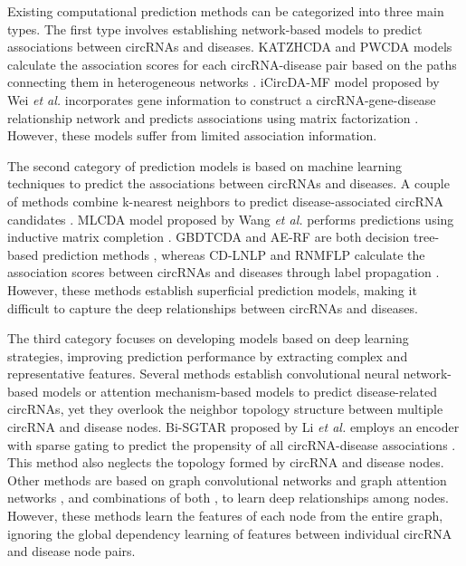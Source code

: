\documentclass[journal,twoside,web]{ieeecolor}
\begin{document}
Existing computational prediction methods can be categorized into three main types. The first type involves establishing network-based models to predict associations between circRNAs and diseases. KATZHCDA and PWCDA models calculate the association scores for each circRNA-disease pair based on the paths connecting them in heterogeneous networks \cite{fan2018prediction, lei2018pwcda}. iCircDA-MF model proposed by Wei {\it et al.} incorporates gene information to construct a circRNA-gene-disease relationship network and predicts associations using matrix factorization \cite{wei2020icircda}. However, these models suffer from limited association information.

The second category of prediction models is based on machine learning techniques to predict the associations between circRNAs and diseases. A couple of methods combine k-nearest neighbors to predict disease-associated circRNA candidates \cite{wang2022combining, lei2020integrating, yan2018dwnn}. MLCDA model proposed by Wang {\it et al.} performs predictions using inductive matrix completion \cite{wang2022machine}. GBDTCDA and AE-RF are both decision tree-based prediction methods \cite{lei2019gbdtcda, deepthi2021inferring}, whereas CD-LNLP and RNMFLP calculate the association scores between circRNAs and diseases through label propagation \cite{zhang2019predicting, peng2022rnmflp}. However, these methods establish superficial prediction models, making it difficult to capture the deep relationships between circRNAs and diseases.

The third category focuses on developing models based on deep learning strategies, improving prediction performance by extracting complex and representative features. 
Several methods establish convolutional neural network-based models \cite{tian2024mamlcda, wang2020efficient, lu2020improving,liang2025predicting} or attention mechanism-based models \cite{zhang2025predicting} to predict disease-related circRNAs, yet they overlook the neighbor topology structure between multiple circRNA and disease nodes. %
Bi-SGTAR proposed by Li {\it et al.} employs an encoder with sparse gating to predict the propensity of all circRNA-disease associations \cite{li2024bi}. This method also neglects the topology formed by circRNA and disease nodes. Other methods are based on graph convolutional networks \cite{shang2024sgfccda, liu2023mpclcda, wu2022mdgf, he2025rpmvcda} and graph attention networks \cite{wu2023mlngcf,wang2023amdecda}, and combinations of both \cite{dai2022graphcda}, to learn deep relationships among nodes. %
However, these methods learn the features of each node from the entire graph, ignoring the global dependency learning of features between individual circRNA and disease node pairs.
\end{document}
